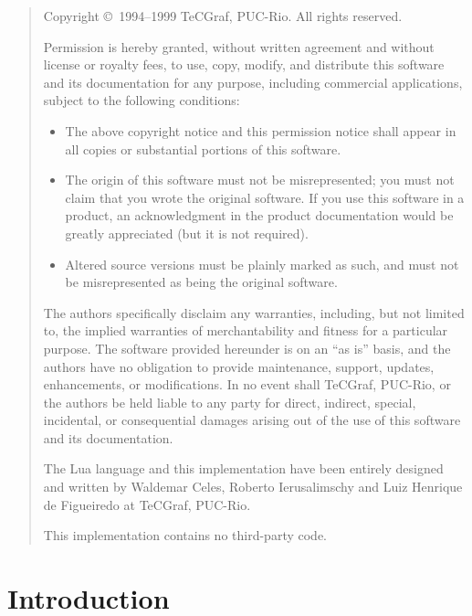 \documentclass[11pt]{article}
\begin{document}
\newpage
\begin{quotation}
\parskip=10pt
\noindent
\footnotesize
Copyright \copyright\ 1994--1999 TeCGraf, PUC-Rio.  All rights reserved.

\noindent
Permission is hereby granted, without written agreement and without license
or royalty fees, to use, copy, modify, and distribute this software and its
documentation for any purpose, including commercial applications, subject to
the following conditions:
\begin{itemize}
\item The above copyright notice and this permission notice shall appear in all
   copies or substantial portions of this software.

\item The origin of this software must not be misrepresented; you must not
   claim that you wrote the original software. If you use this software in a
   product, an acknowledgment in the product documentation would be greatly
   appreciated (but it is not required).

\item Altered source versions must be plainly marked as such, and must not be
   misrepresented as being the original software.
\end{itemize}
The authors specifically disclaim any warranties, including, but not limited
to, the implied warranties of merchantability and fitness for a particular
purpose.  The software provided hereunder is on an ``as is'' basis, and the
authors have no obligation to provide maintenance, support, updates,
enhancements, or modifications.  In no event shall TeCGraf, PUC-Rio, or the
authors be held liable to any party for direct, indirect, special,
incidental, or consequential damages arising out of the use of this software
and its documentation.

\noindent
The Lua language and this implementation have been entirely designed and 
written by Waldemar Celes, Roberto Ierusalimschy and Luiz Henrique de 
Figueiredo at TeCGraf, PUC-Rio.

\noindent
This implementation contains no third-party code.
\end{quotation} 

\newpage

\tableofcontents

\newpage
\setcounter{page}{1}
\pagestyle{plain}


\section{Introduction}
\end{document}
